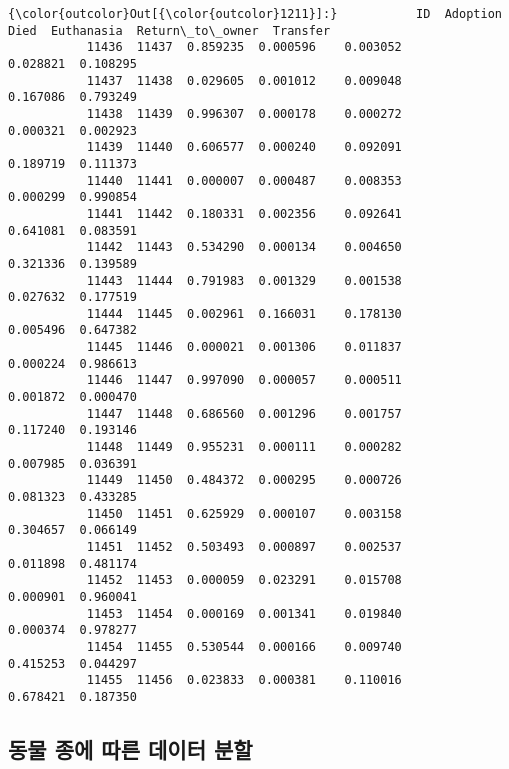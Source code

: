 \documentclass[11pt]{article}
\begin{document}
\begin{Verbatim}[commandchars=\\\{\}]
{\color{outcolor}Out[{\color{outcolor}1211}]:}           ID  Adoption      Died  Euthanasia  Return\_to\_owner  Transfer
           11436  11437  0.859235  0.000596    0.003052         0.028821  0.108295
           11437  11438  0.029605  0.001012    0.009048         0.167086  0.793249
           11438  11439  0.996307  0.000178    0.000272         0.000321  0.002923
           11439  11440  0.606577  0.000240    0.092091         0.189719  0.111373
           11440  11441  0.000007  0.000487    0.008353         0.000299  0.990854
           11441  11442  0.180331  0.002356    0.092641         0.641081  0.083591
           11442  11443  0.534290  0.000134    0.004650         0.321336  0.139589
           11443  11444  0.791983  0.001329    0.001538         0.027632  0.177519
           11444  11445  0.002961  0.166031    0.178130         0.005496  0.647382
           11445  11446  0.000021  0.001306    0.011837         0.000224  0.986613
           11446  11447  0.997090  0.000057    0.000511         0.001872  0.000470
           11447  11448  0.686560  0.001296    0.001757         0.117240  0.193146
           11448  11449  0.955231  0.000111    0.000282         0.007985  0.036391
           11449  11450  0.484372  0.000295    0.000726         0.081323  0.433285
           11450  11451  0.625929  0.000107    0.003158         0.304657  0.066149
           11451  11452  0.503493  0.000897    0.002537         0.011898  0.481174
           11452  11453  0.000059  0.023291    0.015708         0.000901  0.960041
           11453  11454  0.000169  0.001341    0.019840         0.000374  0.978277
           11454  11455  0.530544  0.000166    0.009740         0.415253  0.044297
           11455  11456  0.023833  0.000381    0.110016         0.678421  0.187350
\end{Verbatim}
            
    \subsection{동물 종에 따른 데이터
분할}\label{uxb3d9uxbb3c-uxc885uxc5d0-uxb530uxb978-uxb370uxc774uxd130-uxbd84uxd560}
\end{document}
